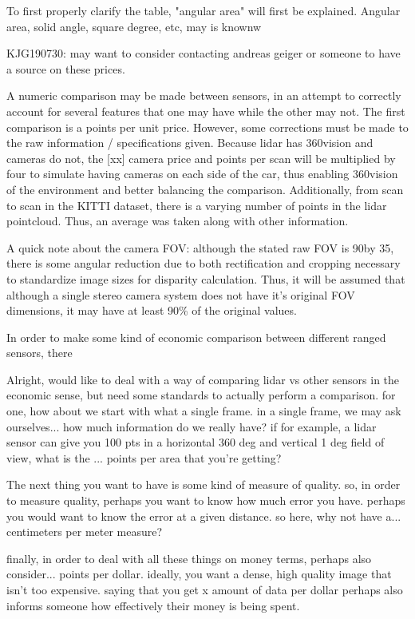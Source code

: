 To first properly clarify the table, "angular area" will first be explained. Angular area, solid angle, square degree, etc, may is knownw 


KJG190730: may want to consider contacting andreas geiger or someone to have a source on these prices.

A numeric comparison may be made between sensors, in an attempt to correctly account for several features that one may have while the other may not. The first comparison is a points per unit price. However, some corrections must be made to the raw information / specifications given. Because lidar has 360\deg vision and cameras do not, the [xx] camera price and points per scan will be multiplied by four to simulate having cameras on each side of the car, thus enabling 360\deg vision of the environment and better balancing the comparison. Additionally, from scan to scan in the KITTI dataset, there is a varying number of points in the lidar pointcloud. Thus, an average was taken along with other information.


A quick note about the camera FOV: although the stated raw FOV is 90\deg by 35\deg, there is some angular reduction due to both rectification and cropping necessary to standardize image sizes for disparity calculation. Thus, it will be assumed that although a single stereo camera system does not have it's original FOV dimensions, it may have at least 90\% of the original values. 





In order to make some kind of economic comparison between different ranged sensors, there 

Alright, would like to deal with a way of comparing lidar vs other sensors in the economic sense, but need some standards to actually perform a comparison. for one, how about we start with what a single frame. in a single frame, we may ask ourselves... how much information do we really have? if for example, a lidar sensor can give you 100 pts in a horizontal 360 deg and vertical 1 deg field of view, what is the ... points per area that you're getting? 


The next thing you want to have is some kind of measure of quality. so, in order to measure quality, perhaps you want to know how much error you have. perhaps you would want to know the error at a given distance. so here, why not have a... centimeters per meter measure? 

finally, in order to deal with all these things on money terms, perhaps also consider... points per dollar. ideally, you want a dense, high quality image that isn't too expensive. saying that you get x amount of data per dollar perhaps also informs someone how effectively their money is being spent. 


